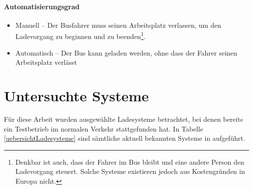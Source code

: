 \paragraph{Automatisierungsgrad}
\begin{itemize}
	\item Manuell – Der Busfahrer muss seinen Arbeitsplatz verlassen, um den Ladevorgang zu beginnen und zu beenden\footnote{Denkbar ist auch, dass der Fahrer im Bus bleibt und eine andere Person den Ladevorgang steuert. Solche Systeme existieren jedoch aus Kostengründen in Europa nicht.}.
	\item Automatisch – Der Bus kann geladen werden, ohne dass der Fahrer seinen Arbeitsplatz verlässt
\end{itemize}

\section{Untersuchte Systeme}
\label{untersuchte_Systeme}
Für diese Arbeit wurden ausgewählte Ladesysteme betrachtet, bei denen bereits ein Testbetrieb im normalen Verkehr stattgefunden hat. In Tabelle \ref{uebersichtLadesysteme} sind sämtliche aktuell bekannten Systeme in aufgeführt. 

